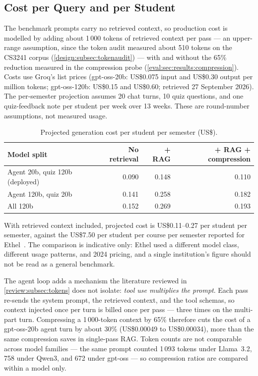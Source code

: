 \subsection{Cost per Query and per Student}
\label{eval:subsec:results:cost}

The benchmark prompts carry no retrieved context, so production cost is
modelled by adding about 1\,000 tokens of retrieved context per pass --- an
upper-range assumption, since the token audit measured about 510 tokens on
the CS3241 corpus (\autoref{design:subsec:tokenaudit}) --- with
and without the 65\% reduction measured in the compression probe
(\autoref{eval:sec:results:compression}). Costs use Groq's list prices
(gpt-oss-20b: US\$0.075 input and US\$0.30 output per million tokens;
gpt-oss-120b: US\$0.15 and US\$0.60; retrieved 27 September 2026). The
per-semester projection assumes 20 chat turns, 10 quiz questions, and one
quiz-feedback note per student per week over 13 weeks. These are
round-number assumptions, not measured usage.

\begin{table}[htb]
  \centering
  \caption{Projected generation cost per student per semester (US\$).}
  \label{eval:tab:cost}
  \footnotesize
  \begin{tabular}{l r r r}
    \hline
    \textbf{Model split} & \textbf{No retrieval} & \textbf{+ RAG}
      & \textbf{+ RAG + compression} \\
    \hline
    Agent 20b, quiz 120b (deployed) & 0.090 & 0.148 & 0.110 \\
    Agent 120b, quiz 20b            & 0.141 & 0.258 & 0.182 \\
    All 120b                        & 0.152 & 0.269 & 0.193 \\
    \hline
  \end{tabular}
\end{table}

With retrieved context included, projected cost is US\$0.11--0.27 per
student per semester, against the US\$7.50 per student per course per
semester reported for Ethel~\cite{tpt24:Kortemeyer}. The comparison is
indicative only: Ethel used a different model class, different usage
patterns, and 2024 pricing, and a single institution's figure should not be
read as a general benchmark.

The agent loop adds a mechanism the literature reviewed in
\autoref{review:subsec:tokens} does not isolate: \emph{tool use multiplies the
prompt}. Each pass re-sends the system prompt, the retrieved context, and the
tool schemas, so context injected once per turn is billed once per pass ---
three times on the multi-part turn. Compressing a 1\,000-token context by
65\% therefore cuts the cost of a gpt-oss-20b agent turn by about 30\%
(US\$0.00049 to US\$0.00034), more than the same compression saves in
single-pass RAG. Token counts are not comparable across model families ---
the same prompt counted 1\,093 tokens under Llama~3.2, 758 under Qwen3, and
672 under gpt-oss --- so compression ratios are compared within a model only.

